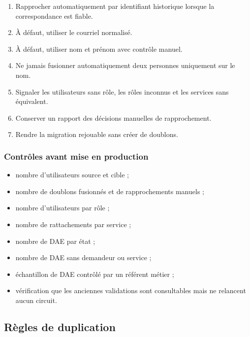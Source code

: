 \begin{enumerate}
  \item Rapprocher automatiquement par identifiant historique lorsque la correspondance est fiable.
  \item À défaut, utiliser le courriel normalisé.
  \item À défaut, utiliser nom et prénom avec contrôle manuel.
  \item Ne jamais fusionner automatiquement deux personnes uniquement sur le nom.
  \item Signaler les utilisateurs sans rôle, les rôles inconnus et les services sans équivalent.
  \item Conserver un rapport des décisions manuelles de rapprochement.
  \item Rendre la migration rejouable sans créer de doublons.
\end{enumerate}

\subsubsection{Contrôles avant mise en production}

\begin{itemize}
  \item nombre d'utilisateurs source et cible ;
  \item nombre de doublons fusionnés et de rapprochements manuels ;
  \item nombre d'utilisateurs par rôle ;
  \item nombre de rattachements par service ;
  \item nombre de DAE par état ;
  \item nombre de DAE sans demandeur ou service ;
  \item échantillon de DAE contrôlé par un référent métier ;
  \item vérification que les anciennes validations sont consultables mais ne relancent aucun circuit.
\end{itemize}

\subsection{Règles de duplication}

